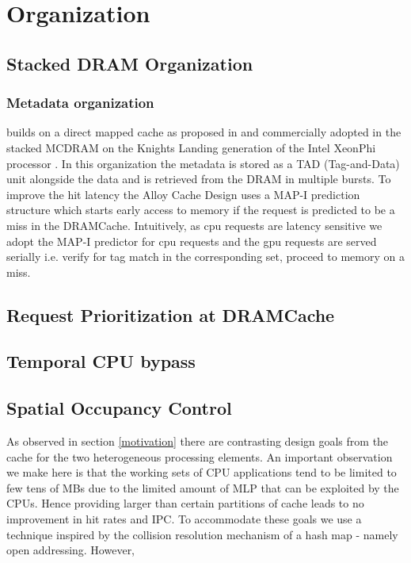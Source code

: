 \section{\cachename Organization} \label{mechanism}
\subsection{Stacked DRAM Organization} \label{rbhvblp}
\subsubsection{Metadata organization}
\cachename builds on a direct mapped cache as proposed in \cite{alloy} and commercially adopted in the stacked MCDRAM on the Knights Landing generation of the Intel XeonPhi processor \cite{xeonphi}. In this organization the metadata is stored as a TAD (Tag-and-Data) unit alongside the data and is retrieved from the DRAM in multiple bursts. To improve the hit latency the Alloy Cache Design uses a MAP-I prediction structure which starts early access to memory if the request is predicted to be a miss in the DRAMCache. Intuitively, as cpu requests are latency sensitive we adopt the MAP-I predictor for cpu requests and the gpu requests are served serially i.e. verify for tag match in the corresponding set, proceed to memory on a miss.
\subsection{Request Prioritization at DRAMCache}
\subsection{Temporal CPU bypass}
\subsection{Spatial Occupancy Control}
As observed in section \ref{motivation} there are contrasting design goals from the cache for the two heterogeneous processing elements. An important observation we make here is that the working sets of CPU applications tend to be limited to few tens of MBs due to the limited amount of MLP that can be exploited by the CPUs. Hence providing larger than certain partitions of cache leads to no improvement in hit rates and IPC. To accommodate these goals we use a technique inspired by the collision resolution mechanism of a hash map - namely open addressing. However, 